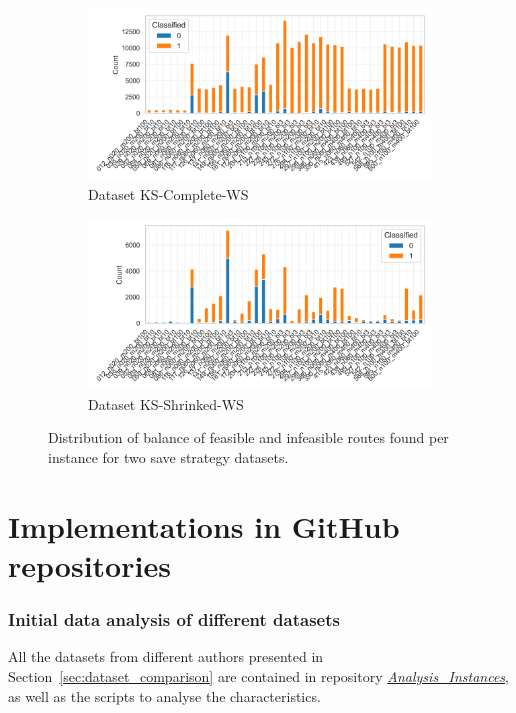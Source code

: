 \begin{figure}[!ht]
	\centering
	\begin{subfigure}[t]{.5\textwidth}
		\centering
		\includegraphics[width=\linewidth]{pictures/dataset_structure/distribution_plot_krebs_28880_600_WS.png}
		\caption{Dataset KS-Complete-WS}
		\label{fig:ds-a-krebs_x}
	\end{subfigure}%
	\begin{subfigure}[t]{.5\textwidth}
		\centering
		\includegraphics[width=\linewidth]{pictures/dataset_structure/distribution_plot_krebs_28880_600_WS_shrinked094.png}
		\caption{Dataset KS-Shrinked-WS}
		\label{fig:ds-b-krebs_l}
	\end{subfigure}
	\caption{Distribution of balance of feasible and infeasible routes found per \krebsADataSetText instance for two save strategy datasets.}
	\label{fig:route-feasibility_save_krebs}
\end{figure}

\clearpage
\section{Implementations in GitHub repositories}
\label{app:sec:github_implementations}

\subsubsection{Initial data analysis of different datasets}
All the datasets from different authors presented in Section~\ref{sec:dataset_comparison} are contained in repository
\href{https://github.com/MxHbm/Analysis_Instances}{\textit{Analysis\_Instances}}, as well as the scripts to analyse the characteristics.

